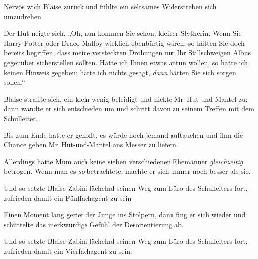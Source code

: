 Nervös wich Blaise zurück und fühlte ein seltsames Widerstreben sich umzudrehen.

Der Hut neigte sich.
„Oh, nun kommen Sie schon, kleiner Slytherin. Wenn Sie Harry Potter oder Draco Malfoy wirklich ebenbürtig wären, so hätten Sie doch bereits begriffen, dass meine versteckten Drohungen nur Ihr Stillschweigen Albus gegenüber sicherstellen sollten. Hätte ich Ihnen etwas antun wollen, so hätte ich keinen Hinweis gegeben; hätte ich nichts gesagt, \emph{dann} hätten Sie sich sorgen sollen.“

Blaise straffte sich, ein klein wenig beleidigt und nickte Mr~Hut-und-Mantel zu; dann wandte er sich entschieden um und schritt davon zu seinem Treffen mit dem Schulleiter.

Bis zum Ende hatte er gehofft, es würde noch jemand auftauchen und ihm die Chance geben Mr~Hut-und-Mantel ans Messer zu liefern.

Allerdings hatte Mum auch keine sieben verschiedenen Ehemänner \emph{gleichzeitig} betrogen. Wenn man es \emph{so} betrachtete, machte er sich immer noch besser als sie.

Und so setzte Blaise Zabini lächelnd seinen Weg zum Büro des Schulleiters fort, zufrieden damit ein Fünffachagent zu sein —

Einen Moment lang geriet der Junge ins Stolpern, dann fing er sich wieder und schüttelte das merkwürdige Gefühl der Desorientierung ab.

Und so setzte Blaise Zabini lächelnd seinen Weg zum Büro des Schulleiters fort, zufrieden damit ein Vierfachagent zu sein.

